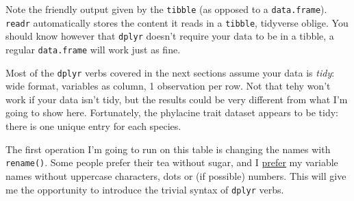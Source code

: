 \documentclass[]{book}
\begin{document}
Note the friendly output given by the \texttt{tibble} (as opposed to a \texttt{data.frame}). \texttt{readr} automatically stores the content it reads in a \texttt{tibble}, tidyverse oblige. You should know however that \texttt{dplyr} doesn't require your data to be in a tibble, a regular \texttt{data.frame} will work just as fine.

Most of the \texttt{dplyr} verbs covered in the next sections assume your data is \emph{tidy}: wide format, variables as column, 1 observation per row. Not that tehy won't work if your data isn't tidy, but the results could be very different from what I'm going to show here. Fortunately, the phylacine trait dataset appears to be tidy: there is one unique entry for each species.

The first operation I'm going to run on this table is changing the names with
\texttt{rename()}. Some people prefer their tea without sugar, and I \href{https://style.tidyverse.org/syntax.html\#object-names}{prefer} my
variable names without uppercase characters, dots or (if possible) numbers.
This will give me the opportunity to introduce the trivial syntax
of \texttt{dplyr} verbs.
\end{document}
